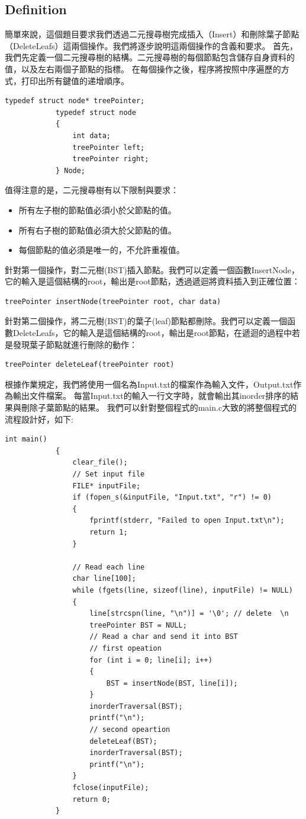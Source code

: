 \documentclass{article}
\begin{document}
	\subsection{Definition}
	簡單來說，這個題目要求我們透過二元搜尋樹完成插入（Insert）和刪除葉子節點（DeleteLeafs）這兩個操作。我們將逐步說明這兩個操作的含義和要求。
	首先，我們先定義一個二元搜尋樹的結構。二元搜尋樹的每個節點包含儲存自身資料的值，以及左右兩個子節點的指標。
	在每個操作之後，程序將按照中序遍歷的方式，打印出所有鍵值的递增順序。
		\begin{lstlisting}[style=Cstyle]
			typedef struct node* treePointer;
			typedef struct node
			{
				int data;
				treePointer left;
				treePointer right;
			} Node;
		\end{lstlisting}
		值得注意的是，二元搜尋樹有以下限制與要求：
		\begin{itemize}
			\item 所有左子樹的節點值必須小於父節點的值。
			\item 所有右子樹的節點值必須大於父節點的值。
			\item 每個節點的值必須是唯一的，不允許重複值。
		\end{itemize}

		\vspace{0.6cm}
      	針對第一個操作，對二元樹(BST)插入節點。我們可以定義一個函數InsertNode，它的輸入是這個結構的root，輸出是root節點，透過遞迴將資料插入到正確位置：
	     \begin{lstlisting}[style=Cstyle]
			treePointer insertNode(treePointer root, char data)
		\end{lstlisting}
		\vspace{0.6cm}

		針對第二個操作，將二元樹(BST)的葉子(leaf)節點都刪除。我們可以定義一個函數DeleteLeafs，它的輸入是這個結構的root，輸出是root節點，在遞迴的過程中若是發現葉子節點就進行刪除的動作：
		\begin{lstlisting}[style=Cstyle]
			treePointer deleteLeaf(treePointer root)
		\end{lstlisting}
		 

		根據作業規定，我們將使用一個名為Input.txt的檔案作為輸入文件，Output.txt作為輸出文件檔案。
		每當Input.txt的輸入一行文字時，就會輸出其inorder排序的結果與刪除子葉節點的結果。
		我們可以針對整個程式的main.c大致的將整個程式的流程設計好，如下:
		\begin{lstlisting}[style=Cstyle]
			int main()
			{
				clear_file();
				// Set input file 
				FILE* inputFile;
				if (fopen_s(&inputFile, "Input.txt", "r") != 0)
				{
					fprintf(stderr, "Failed to open Input.txt\n");
					return 1;
				}
			
				// Read each line
				char line[100];
				while (fgets(line, sizeof(line), inputFile) != NULL)
				{
					line[strcspn(line, "\n")] = '\0'; // delete  \n 
					treePointer BST = NULL;
					// Read a char and send it into BST 
					// first opeation 
					for (int i = 0; line[i]; i++)
					{
						BST = insertNode(BST, line[i]);
					}
					inorderTraversal(BST); 
					printf("\n");
					// second opeartion 
					deleteLeaf(BST); 
					inorderTraversal(BST);
					printf("\n");
				}
				fclose(inputFile);
				return 0;
			}
		\end{lstlisting}
\end{document}
